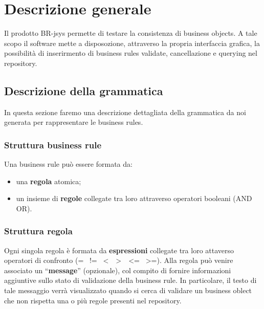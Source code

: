 \chapter{Descrizione generale}
Il prodotto BR-jsys permette di testare la consistenza di business objects. A tale scopo il software mette a disposozione, attraverso la propria interfaccia grafica, la possibilit\`a di inserirmento di business rules validate, cancellazione e querying nel repository.

\section{Descrizione della grammatica}
In questa sezione faremo una descrizione dettagliata della grammatica da noi generata per rappresentare le business rules. 
\subsection{Struttura business rule}
Una business rule pu\`o essere formata da:
\begin{itemize}
\item una \textbf{regola} atomica;
\item un insieme di \textbf{regole} collegate tra loro attraverso operatori booleani (AND \textbar OR).
\end{itemize}
\subsection{Struttura regola}
Ogni singola regola \`e formata da \textbf{espressioni} collegate tra loro attaverso operatori di confronto (= \textbar\ != \textbar\ \textless\ \textbar\ \textgreater\ \textbar\ \textless= \textbar\ \textgreater=). Alla regola pu\`o venire associato un ``\textbf{message}'' (opzionale), col compito di fornire informazioni aggiuntive sullo stato di validazione della business rule. In particolare, il testo di tale messaggio verr\`a visualizzato quando si cerca di validare un business oblect che non rispetta una o pi\`u regole presenti nel repository.
